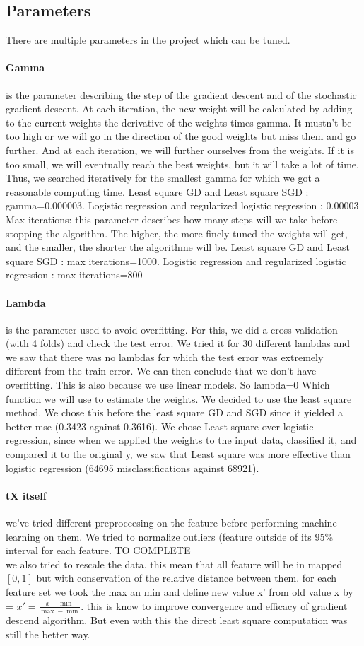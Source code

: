 \documentclass[10pt,conference,compsocconf]{IEEEtran}
\begin{document}
\subsection{Parameters}
There are multiple parameters in the project which can be tuned. 
\paragraph{Gamma} is the parameter describing the step of the gradient descent and of the stochastic gradient descent. At each iteration, the new weight will be calculated by adding to the current weights the derivative of the weights times gamma. It mustn’t be too high or we will go in the direction of the good weights but miss them and go further. And at each iteration, we will further ourselves from the weights. If it is too small, we will eventually reach the best weights, but it will take a lot of time. Thus, we searched iteratively for the smallest gamma for which we got a reasonable computing time.
Least square GD and Least square SGD : gamma=0.000003.
Logistic regression and regularized logistic regression : 0.00003
Max iterations: this parameter describes how many steps will we take before stopping the algorithm. The higher, the more finely tuned the weights will get, and the smaller, the shorter the algorithme will be. 
Least square GD and Least square SGD : max iterations=1000.
Logistic regression and regularized logistic regression :  max iterations=800
\paragraph{Lambda} is the parameter used to avoid overfitting. For this, we did a cross-validation (with 4 folds) and check the test error. We tried it for 30 different lambdas and we saw that there was no lambdas for which the test error was extremely different from the train error. We can then conclude that we don’t have overfitting. This is also because we use linear models. So lambda=0
 Which function we will use to estimate the weights. We decided to use the least square method. We chose this before the least square GD and SGD since it yielded a better mse (0.3423 against 0.3616). We chose Least square over logistic regression, since when we applied the weights to the input data, classified it, and compared it to the original y, we saw that Least square was more effective than logistic regression (64695 misclassifications against 68921).
\paragraph{tX itself} we've tried different preproceesing on the feature before performing machine learning on them. We tried to normalize outliers (feature outside of its 95\%  interval for each feature. TO COMPLETE\\
we also tried to rescale the data. this mean that all feature will be in mapped \( [0,1] \) but with conservation of the relative distance between them. for each feature set we took the max an min and define new value x' from old value x by = \( x' = \frac{x-\min}{\max - \min }\). this is know to improve convergence and efficacy of gradient descend algorithm. But even with this the direct least square computation was still the better way.
\end{document}
